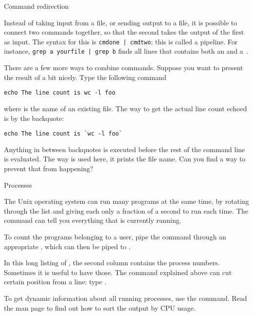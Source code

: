  {Command redirection}
\label{tut:unix-bq}

Instead of taking input from a file, or sending output to a file, it
is possible to connect two commands together, so that the second takes
the output of the first as input. The syntax for this is
\verb+cmdone | cmdtwo+; this is called a pipeline. For instance,
\verb+grep a yourfile | grep b+ finds all lines that contains both an
 and a~.

{}{}

There are a few more ways to combine commands. Suppose you want to
present the result of  a bit nicely. Type the following command
\begin{verbatim}
echo The line count is wc -l foo
\end{verbatim}
where  is the name of an existing file. The way to
get the actual line count echoed is by the backquote:
\begin{verbatim}
echo The line count is `wc -l foo`
\end{verbatim}
Anything in between backquotes is executed before the rest of the
command line is evaluated. The way  is used here, it prints the
file name. Can you find a way to prevent that from happening?

 {Processes}

The Unix operating system can run many programs at the same time, by
rotating through
the list and giving each only a  fraction of a second to run each time.
The command  can tell you everything that is currently running.

{To count the programs belonging to a user, pipe the  command
  through an appropriate , which can then be piped to .}
{}

In this long listing of , the second column contains the process
numbers. Sometimes it is useful to have those. The  command
explained above can
cut certain position from a line: type .

To get dynamic information about all running processes, use the
 command. Read the man page to find out how to sort the output
by CPU usage.

